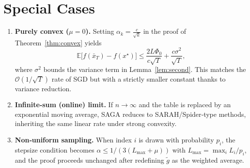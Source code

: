 \documentclass{article}
\newcommand{\E}{\mathbb{E}}
\begin{document}
\section*{Special Cases}
\begin{enumerate}[label=(\alph*)]
\item \textbf{Purely convex ($\mu=0$).}  
Setting $\alpha_k = \frac{c}{\sqrt{k}}$ in the proof of Theorem~\ref{thm:convex} yields
\[
\E\!\bigl[f(\bar x_T)-f(x^{\star})\bigr]\le
\frac{2L\Phi_0}{c\sqrt{T}}+ \frac{c\sigma^{2}}{\sqrt{T}},
\]
where $\sigma^{2}$ bounds the variance term in Lemma~\ref{lem:second}. This matches the $\mathcal O(1/\sqrt{T})$ rate of SGD but with a strictly smaller constant thanks to variance reduction.

\item \textbf{Infinite‑sum (online) limit.}  
If $n\to\infty$ and the table is replaced by an exponential moving average, SAGA reduces to SARAH/Spider‑type methods, inheriting the same linear rate under strong convexity.

\item \textbf{Non‑uniform sampling.}  
When index $i$ is drawn with probability $p_i$, the stepsize condition becomes $\alpha\le 1/(3(L_{\max}+ \mu))$ with $L_{\max}=\max_i L_i/p_i$, and the proof proceeds unchanged after redefining $\tilde g$ as the weighted average.
\end{enumerate}
\end{document}
